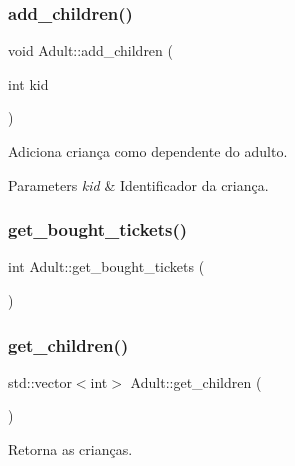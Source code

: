 \subsubsection{\texorpdfstring{add\+\_\+children()}{add\_children()}}
{\footnotesize\ttfamily void Adult\+::add\+\_\+children (\begin{DoxyParamCaption}\item[{int}]{kid }\end{DoxyParamCaption})}



Adiciona criança como dependente do adulto. 


\begin{DoxyParams}{Parameters}
{\em kid} & Identificador da criança. \\
\hline
\end{DoxyParams}
\mbox{\label{class_adult_af30d7f77bbaca033813259e66c630aa9}} 
\subsubsection{\texorpdfstring{get\+\_\+bought\+\_\+tickets()}{get\_bought\_tickets()}}
{\footnotesize\ttfamily int Adult\+::get\+\_\+bought\+\_\+tickets (\begin{DoxyParamCaption}{ }\end{DoxyParamCaption})\hspace{0.3cm}{\ttfamily [inline]}}

\mbox{\label{class_adult_a19e1475bf7f14c3bee931298cdd9b121}} 
\subsubsection{\texorpdfstring{get\+\_\+children()}{get\_children()}}
{\footnotesize\ttfamily std\+::vector$<$int$>$ Adult\+::get\+\_\+children (\begin{DoxyParamCaption}{ }\end{DoxyParamCaption})\hspace{0.3cm}{\ttfamily [inline]}}



Retorna as crianças. 

